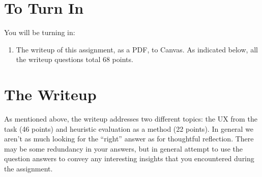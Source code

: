 \documentclass{article}
\begin{document}
\section{To Turn In}
You will be turning in:
\begin{enumerate}
    \item The writeup of this assignment, as a PDF, to Canvas. As indicated below, all the writeup questions total 68 points.
    
\end{enumerate}

\section{The Writeup}
As mentioned above, the writeup addresses two different topics: the UX from the task (46 points) and heuristic evaluation as a method (22 points). In general we aren't as much looking for the ``right'' answer as for thoughtful reflection. There may be some redundancy in your answers, but in general attempt to use the question answers to convey any interesting insights that you encountered during the assignment.
\end{document}

